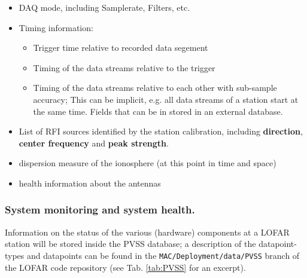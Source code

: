 \documentclass[a4paper,10pt,bibtotoc]{scrartcl}
\begin{document}
\begin{itemize} \parskip 0pt
\item DAQ mode, including Samplerate, Filters, etc.
\item Timing information:
  \begin{itemize}
  \item Trigger time relative to recorded data segement
  \item Timing of the data streams relative to the trigger
  \item Timing of the data streams relative to each other with sub-sample
    accuracy; This can be implicit, e.g. all data streams of a station start
    at the same time. Fields that can be in stored in an external database.
  \end{itemize}
\item List of RFI sources identified by the station calibration, including
  \textbf{direction}, \textbf{center frequency} and \textbf{peak strength}.
\item dispersion measure of the ionosphere (at this point in time and space)
\item health information about the antennas
\end{itemize}

\subsubsection{System monitoring and system health.}

Information on the status of the various (hardware) components at a LOFAR station
will be stored inside the PVSS database; a description of the datapoint-types and
datapoints can be found in the \verb|MAC/Deployment/data/PVSS| branch of the
LOFAR code repository (see Tab. \ref{tab:PVSS} for an excerpt).
\end{document}
